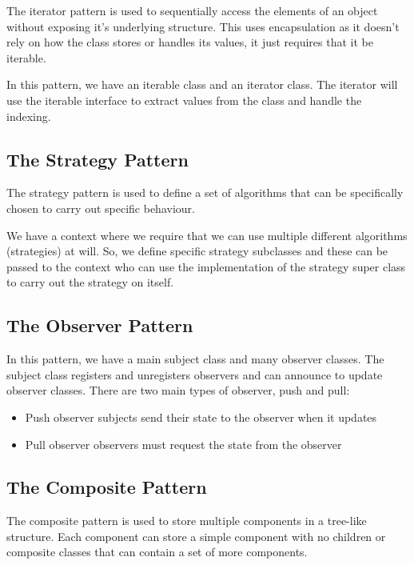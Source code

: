 \documentclass[a4paper, 12pt, twoside]{article}
\begin{document}
The iterator pattern is used to sequentially access the
elements of an object without exposing it's underlying structure.
This uses encapsulation as it doesn't rely on how the class
stores or handles its values, it just requires that it be
iterable.

\vspace{\baselineskip}

In this pattern, we have an iterable class and an iterator class.
The iterator will use the iterable interface to extract values
from the class and handle the indexing.

\newpage

\subsection{The Strategy Pattern}

The strategy pattern is used to define a set of algorithms that
can be specifically chosen to carry out specific behaviour.

\vspace{\baselineskip}

We have a context where we require that we can use multiple different
algorithms (strategies) at will. So, we define specific strategy
subclasses and these can be passed to the context who can
use the implementation of the strategy super class to carry
out the strategy on itself.

\subsection{The Observer Pattern}

In this pattern, we have a main subject class and
many observer classes. The subject class registers and
unregisters observers and can announce to update observer classes.
There are two main types of observer, push and pull:
\begin{itemize}
    \item Push observer subjects send their state to the observer when
    it updates
    \item Pull observer observers must request the state from the 
    observer    
\end{itemize}

\subsection{The Composite Pattern}

The composite pattern is used to store multiple components in a
tree-like structure. Each component can store a simple component
with no children or composite classes that can contain a set of
more components.
\end{document}
